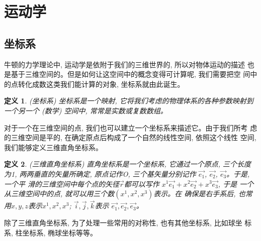 \documentclass{ctexart}
\numberwithin{equation}{subsection}
\numberwithin{theorem}{subsection}
\newtheorem{definition} {定义}
\numberwithin{definition}{subsection}
\numberwithin{proof}{subsection}
\numberwithin{lemma}{subsection}
\numberwithin{example}{subsection}
\numberwithin{remark}{subsection}
\numberwithin{corollary}{subsection}
\numberwithin{exercise}{subsection}
\numberwithin{problem}{subsection}
\numberwithin{question}{section}
\numberwithin{method}{subsection}
\begin{document}
    \section{运动学}

    \subsection{坐标系}
    

    牛顿的力学理论中, 运动学是依附于我们的三维世界的, 所以对物体运动的描述
    也是基于三维空间的。但是如何让这空间中的概念变得可计算呢, 我们需要把空
    间中的点转化成数这类我们能计算的对象, 坐标系就由此诞生。

    \begin{definition}
        \label{1.1 def:coordinate system}
        (坐标系) 坐标系是一个映射, 它将我们考虑的物理体系的各种参数映射到
        一个另一个 (数学) 空间中, 常常是实数或复数数组。
    \end{definition}

    对于一个在三维空间的点, 我们也可以建立一个坐标系来描述它。由于我们所考
    虑的三维空间是平的, 在确定原点后构成了一个自然的线性空间, 依照这个线性
    空间, 我们能够定义三维直角坐标系。

    \begin{definition}
        \label{1.1 def:cartesian coordinate system}
        (三维直角坐标系) 直角坐标系是一个坐标系, 它通过一个原点, 三个长度
        为1, 两两垂直的矢量所确定, 原点记作O, 三个基矢量分别记作
        \(\vec{e_1}\), \(\vec{e_2}\), \(\vec{e_3}\)。于是, 一个平
        滑的三维空间中每个点的矢径\(\vec{r}\)都可以写作
        \(x^1 \vec{e_1} + x^2 \vec{e_2} + x^3 \vec{e_3}\), 于是
        一个从三维空间中的点, 就可以用三个数\((x^1,x^2,x^3)\)表示。在
        确保是右手系后, 也常用\(x,y,z\)表示\(x^1,x^2,x^3\); 
        \(\vec{i},\vec{j},\vec{k}\)表示
        \(\vec{e_1},\vec{e_2},\vec{e_3}\)。
    \end{definition}

    除了三维直角坐标系, 为了处理一些常用的对称性, 也有其他坐标系, 比如球坐
    标系, 柱坐标系, 椭球坐标等等。
\end{document}
